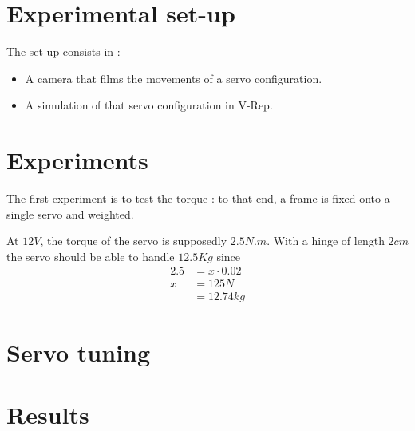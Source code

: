 \section{Experimental set-up}
The set-up consists in :
\begin{itemize}
\item A camera that films the movements of a servo configuration.
\item A simulation of that servo configuration in V-Rep.
\end{itemize}

\section{Experiments}
The first experiment is to test the torque : to that end, a frame is fixed onto a single servo and weighted. 

At $12V$, the torque\cite{mx_28_manual} of the servo is supposedly $2.5N.m$. With a hinge of length $2cm$ the servo should be able to handle $12.5Kg$ since 
\begin{align*}
2.5 &= x \cdot 0.02\\
x &= 125 N\\
&= 12.74 kg
\end{align*}

\section{Servo tuning}

\section{Results}